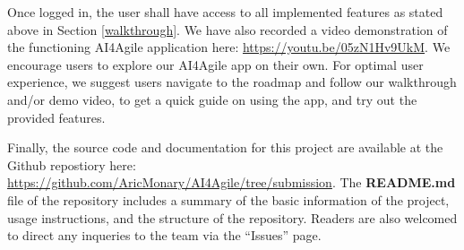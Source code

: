 Once logged in, the user shall have access to all implemented features as stated above in Section \ref{walkthrough}. We have also recorded a video demonstration of the functioning AI4Agile application here: \url{https://youtu.be/05zN1Hv9UkM}. We encourage users to explore our AI4Agile app on their own. For optimal user experience, we suggest users navigate to the roadmap and follow our walkthrough and/or demo video, to get a quick guide on using the app, and try out the provided features.

Finally, the source code and documentation for this project are available at the Github repostiory here: \url{https://github.com/AricMonary/AI4Agile/tree/submission}. The \textbf{README.md} file of the repository includes a summary of the basic information of the project, usage instructions, and the structure of the repository. Readers are also welcomed to direct any inqueries to the team via the ``Issues'' page. 
